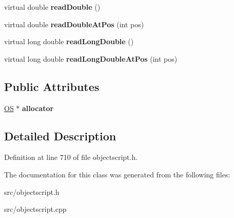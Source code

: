 \begin{DoxyCompactItemize}
\item 
virtual double {\bfseries read\+Double} ()\hypertarget{class_object_script_1_1_o_s_1_1_core_1_1_stream_reader_a9e2a4f6f8b265cc67726624354fd1f56}{}\label{class_object_script_1_1_o_s_1_1_core_1_1_stream_reader_a9e2a4f6f8b265cc67726624354fd1f56}

\item 
virtual double {\bfseries read\+Double\+At\+Pos} (int pos)\hypertarget{class_object_script_1_1_o_s_1_1_core_1_1_stream_reader_a1d793aefe725515a6e6bffb1dd1b40b7}{}\label{class_object_script_1_1_o_s_1_1_core_1_1_stream_reader_a1d793aefe725515a6e6bffb1dd1b40b7}

\item 
virtual long double {\bfseries read\+Long\+Double} ()\hypertarget{class_object_script_1_1_o_s_1_1_core_1_1_stream_reader_a26ce9d58c0e2564daf4be2ee296e1f5e}{}\label{class_object_script_1_1_o_s_1_1_core_1_1_stream_reader_a26ce9d58c0e2564daf4be2ee296e1f5e}

\item 
virtual long double {\bfseries read\+Long\+Double\+At\+Pos} (int pos)\hypertarget{class_object_script_1_1_o_s_1_1_core_1_1_stream_reader_a24826b0ff52bb4aef4e1ca1837adef0c}{}\label{class_object_script_1_1_o_s_1_1_core_1_1_stream_reader_a24826b0ff52bb4aef4e1ca1837adef0c}

\end{DoxyCompactItemize}
\subsection*{Public Attributes}
\begin{DoxyCompactItemize}
\item 
\hyperlink{class_object_script_1_1_o_s}{OS} $\ast$ {\bfseries allocator}\hypertarget{class_object_script_1_1_o_s_1_1_core_1_1_stream_reader_a5617fec0cc6ea57ac380bfb0f2cd9427}{}\label{class_object_script_1_1_o_s_1_1_core_1_1_stream_reader_a5617fec0cc6ea57ac380bfb0f2cd9427}

\end{DoxyCompactItemize}


\subsection{Detailed Description}


Definition at line 710 of file objectscript.\+h.



The documentation for this class was generated from the following files\+:\begin{DoxyCompactItemize}
\item 
src/objectscript.\+h\item 
src/objectscript.\+cpp\end{DoxyCompactItemize}

